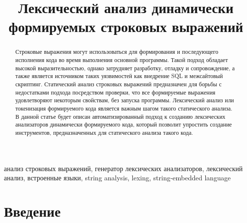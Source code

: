 \documentclass[10pt, conference, compsocconf]{IEEEtran}
\begin{document}

\title{Лексический анализ динамически формируемых строковых выражений}

\author{
\and
{}
}

\maketitle


\begin{abstract}
Строковые выражения могут использоваться для формирования и последующего исполнения кода во время выполнения основной программы. Такой подход обладает высокой выразительностью, однако затрудняет разработку, отладку и сопровождение, а также является источником таких уязвимостей как внедрение SQL и межсайтовый скриптинг. Статический анализ строковых выражений предназначен для борьбы с недостатками подхода посредством проверки, что все формируемые выражения удовлетворяют некоторым свойствам, без запуска программы. Лексический анализ или токенизация формируемого кода является важным шагом такого статического анализа. В данной статье будет описан автоматизированный подход к созданию лексических анализаторов динамически формируемого кода, который позволит упростить создание инструментов, предназначенных для статического анализа такого кода.
\end{abstract}

\vspace{5 mm}
\begin{IEEEkeywords}
 анализ строковых выражений, генератор лексических анализаторов, лексический анализ, встроенные языки, string analysis, lexing, string-embedded language
\end{IEEEkeywords}

\IEEEpeerreviewmaketitle

\section{Введение}
\end{document}
